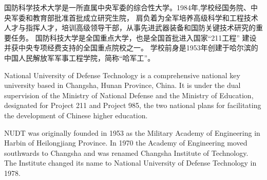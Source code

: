 \begin{cabstract}
国防科学技术大学是一所直属中央军委的综合性大学。1984年,学校经国务院、中央军委和教育部批准首批成立研究生院，%
肩负着为全军培养高级科学和工程技术人才与指挥人才，培训高级领导干部，从事先进武器装备和国防关键技术研究的重要任务。%
国防科技大学是全国重点大学，也是全国首批进入国家“211工程” 建设并获中央专项经费支持的全国重点院校之一。%
学校前身是1953年创建于哈尔滨的中国人民解放军军事工程学院，简称“哈军工”。
\end{cabstract}

\begin{eabstract}
National University of Defense Technology is a comprehensive national key university based in Changsha, %
Hunan Province, China. It is under the dual supervision of the Ministry of National Defense %
and the Ministry of Education, designated for Project 211 and Project 985, %
the two national plans for facilitating the development of Chinese higher education. %

NUDT was originally founded in 1953 as the Military Academy of Engineering in Harbin of Heilongjiang Province. %
In 1970 the Academy of Engineering moved southwards to Changsha and was renamed Changsha Institute of Technology.%
 The Institute changed its name to National University of Defense Technology in 1978.

\end{eabstract}

